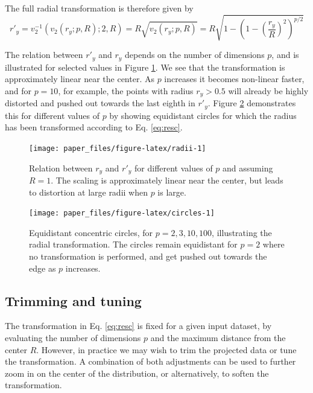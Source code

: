 \documentclass[]{interact}
\theoremstyle{plain}%
\theoremstyle{definition}
\theoremstyle{remark}
\begin{document}
The full radial transformation is therefore given by \begin{equation}
r'_y = v_2^{-1} (v_2(r_y; p, R); 2, R) =  R \sqrt{v_2(r_y; p, R)} = R \sqrt{1-\left(1-\left(\frac{r_y}{R}\right)^2\right)^{p/2}}
\label{eq:resc}
\end{equation}

The relation between \(r'_y\) and \(r_y\) depends on the number of
dimensions \(p\), and is illustrated for selected values in Figure
\ref{fig:radii}. We see that the transformation is approximately linear
near the center. As \(p\) increases it becomes non-linear faster, and
for \(p=10\), for example, the points with radius \(r_y>0.5\) will
already be highly distorted and pushed out towards the last eighth in
\(r'_y\). Figure \ref{fig:circles} demonstrates this for different
values of \(p\) by showing equidistant circles for which the radius has
been transformed according to Eq. \ref{eq:resc}.

\begin{figure}

{\centering \texttt{[image: paper\_files/figure-latex/radii-1]} 

}

\caption{Relation between $r_y$ and $r'_y$ for different values of $p$ and assuming $R=1$. The scaling is approximately linear near the center, but leads to distortion at large radii when $p$ is large.}\label{fig:radii}
\end{figure}

\begin{figure}

{\centering \texttt{[image: paper\_files/figure-latex/circles-1]} 

}

\caption{Equidistant concentric circles, for $p=2, 3, 10, 100$, illustrating the radial transformation. The circles remain equidistant for $p=2$ where no transformation is performed, and get pushed out towards the edge as $p$ increases.}\label{fig:circles}
\end{figure}

\hypertarget{sec:params}{%
\subsection{Trimming and tuning}\label{sec:params}}

The transformation in Eq. \ref{eq:resc} is fixed for a given input
dataset, by evaluating the number of dimensions \(p\) and the maximum
distance from the center \(R\). However, in practice we may wish to trim
the projected data or tune the transformation. A combination of both
adjustments can be used to further zoom in on the center of the
distribution, or alternatively, to soften the transformation.
\end{document}
